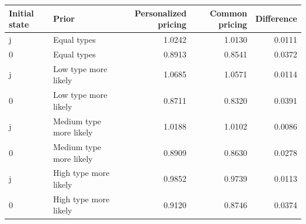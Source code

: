 \begin{tabular}{llrrr}\hline
Initial state & Prior & Personalized pricing & Common pricing & Difference\\\hline
j & Equal types & 1.0242 & 1.0130 & 0.0111 \\
0 & Equal types & 0.8913 & 0.8541 & 0.0372 \\
j & Low type more likely & 1.0685 & 1.0571 & 0.0114 \\
0 & Low type more likely & 0.8711 & 0.8320 & 0.0391 \\
j & Medium type more likely & 1.0188 & 1.0102 & 0.0086 \\
0 & Medium type more likely & 0.8909 & 0.8630 & 0.0278 \\
j & High type more likely & 0.9852 & 0.9739 & 0.0113 \\
0 & High type more likely & 0.9120 & 0.8746 & 0.0374 \\
\hline\end{tabular}
